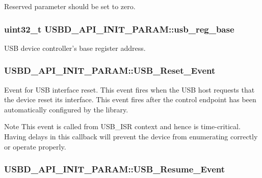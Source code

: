 Reserved parameter should be set to zero. \hypertarget{structUSBD__API__INIT__PARAM_a171d80187485a767c4fdf4dc4c4f330a}{
\subsubsection[{usb\-\_\-reg\-\_\-base}]{\setlength{\rightskip}{0pt plus 5cm}uint32\-\_\-t U\-S\-B\-D\-\_\-\-A\-P\-I\-\_\-\-I\-N\-I\-T\-\_\-\-P\-A\-R\-A\-M\-::usb\-\_\-reg\-\_\-base}}\label{structUSBD__API__INIT__PARAM_a171d80187485a767c4fdf4dc4c4f330a}
U\-S\-B device controller's base register address. \hypertarget{structUSBD__API__INIT__PARAM_a49f0d2a8b163486e07cfea83b436234f}{
\subsubsection[{U\-S\-B\-\_\-\-Reset\-\_\-\-Event}]{ U\-S\-B\-D\-\_\-\-A\-P\-I\-\_\-\-I\-N\-I\-T\-\_\-\-P\-A\-R\-A\-M\-::\-U\-S\-B\-\_\-\-Reset\-\_\-\-Event}}\label{structUSBD__API__INIT__PARAM_a49f0d2a8b163486e07cfea83b436234f}
Event for U\-S\-B interface reset. This event fires when the U\-S\-B host requests that the device reset its interface. This event fires after the control endpoint has been automatically configured by the library. \par
\begin{DoxyNote}{Note}
This event is called from U\-S\-B\-\_\-\-I\-S\-R context and hence is time-\/critical. Having delays in this callback will prevent the device from enumerating correctly or operate properly. 
\end{DoxyNote}
\hypertarget{structUSBD__API__INIT__PARAM_a2fb170236fa92a20f29dc8c13b24a1d1}{
\subsubsection[{U\-S\-B\-\_\-\-Resume\-\_\-\-Event}]{ U\-S\-B\-D\-\_\-\-A\-P\-I\-\_\-\-I\-N\-I\-T\-\_\-\-P\-A\-R\-A\-M\-::\-U\-S\-B\-\_\-\-Resume\-\_\-\-Event}}\label{structUSBD__API__INIT__PARAM_a2fb170236fa92a20f29dc8c13b24a1d1}
